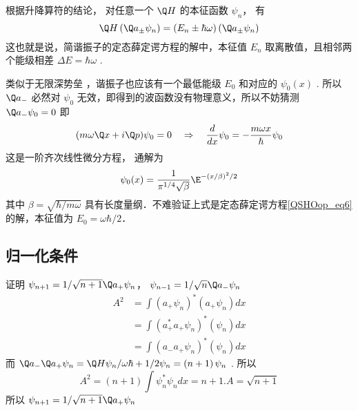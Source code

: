 根据升降算符的结论，%
对任意一个 $\Q H$ 的本征函数 ${\psi _n}$， 有
\begin{equation}
  \Q H\left( {{{\Q a}_ \pm }{\psi _n}} \right) = \left( {{E_n} \pm \hbar \omega } \right)\left( {{{\Q a}_ \pm }{\psi _n}} \right)
\end{equation}
这也就是说，简谐振子的定态薛定谔方程的解中，本征值 ${E_n}$ 取离散值，且相邻两个能级相差 $\Delta E = \hbar \omega $ . 

类似于无限深势垒%
，谐振子也应该有一个最低能级 ${E_0}$ 和对应的 ${\psi _0}\left( x \right)$ . 所以 ${\Q a_ - }$ 必然对 ${\psi _0}$ 无效，即得到的波函数没有物理意义，所以不妨猜测 ${\Q a_ - }{\psi _0} = 0$ 
即
\begin{equation}
(m\omega \Q x + i\Q p){\psi _0} = 0
\quad \Rightarrow \quad
\frac{d}{{dx}}{\psi _0} =  - \frac{{m\omega x}}{\hbar }{\psi _0}
\end{equation}
这是一阶齐次线性微分方程，%
通解为
\begin{equation}
{\psi _0}(x) = \frac{1}{{{\pi ^{1/4}}\sqrt \beta  }}{\E^{ - {{(x/\beta )}^2}/2}}
\end{equation}
其中 $\beta = \sqrt {\hbar /m\omega }$ 具有长度量纲．不难验证上式是定态薛定谔方程\autoref{QSHOop_eq6} 的解，本征值为 $E_0=\omega\hbar/2$．


\subsection{归一化条件}


证明 ${\psi _{n + 1}} = {1}/{{\sqrt {n + 1} }}{\Q a_ + }{\psi _n}$，  ${\psi _{n - 1}} = {1}/{{\sqrt n }}{\Q a_ - }{\psi _n}$ 
\begin{equation}
\begin{aligned}
  {A^2} & = \int {{{\left( {{a_ + }{\psi _n}} \right)}^*}\left( {{a_ + }{\psi _n}} \right)dx} \\
   & = \int {{{\left( {a_ + ^*{a_ + }{\psi _n}} \right)}^*}\left( {{\psi _n}} \right)dx}  \\
   & = \int {{{\left( {{a_ - }{a_ + }{\psi _n}} \right)}^*}\left( {{\psi _n}} \right)dx}
\end{aligned}
\end{equation}
而 ${\Q a_ - }{\Q a_ + }{\psi _n} = {{\Q H{\psi _n}}}/{{\omega \hbar }} + {1}/{2}{\psi _n} = \left( {n + 1} \right){\psi _n}$ . 所以
\begin{equation}
  {A^2} = \left( {n + 1} \right)\int {\psi _n^*{\psi _n}dx}  = n + 1. A = \sqrt {n + 1}
\end{equation}
所以 ${\psi _{n + 1}} = {1}/{{\sqrt {n + 1} }}{\Q a_ + }{\psi _n}$

